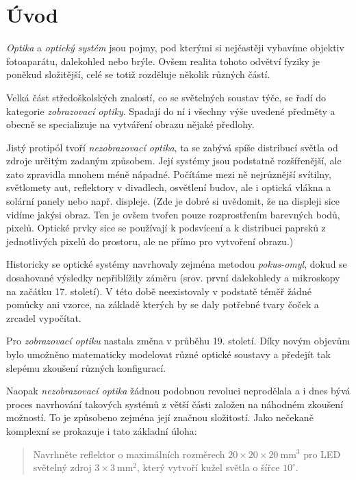 \chapter{Úvod}

\emph{Optika} a \emph{optický systém} jsou pojmy, pod kterými si nejčastěji vybavíme objektiv fotoaparátu, dalekohled nebo brýle. Ovšem realita tohoto odvětví fyziky je poněkud složitější, celé se totiž rozděluje několik různých částí.

Velká část středoškolských znalostí, co se světelných soustav týče, se řadí do kategorie \emph{zobrazovací optiky}. Spadají do ní i všechny výše uvedené předměty a obecně se specializuje na vytváření obrazu nějaké předlohy.

Jistý protipól tvoří \emph{nezobrazovací optika}, ta se zabývá spíše distribucí světla od zdroje určitým zadaným způsobem. Její systémy jsou podstatně rozšířenější, ale zato zpravidla mnohem méně nápadné. Počítáme mezi ně nejrůznější svítilny, světlomety aut, reflektory v divadlech, osvětlení budov, ale i optická vlákna a solární panely nebo např. displeje. (Zde je dobré si uvědomit, že na displeji sice vidíme jakýsi obraz. Ten je ovšem tvořen pouze rozprostřením barevných bodů, pixelů. Optické prvky sice se používají k podsvícení a k distribuci paprsků z jednotlivých pixelů do prostoru, ale ne přímo pro vytvoření obrazu.)

Historicky se optické systémy navrhovaly zejména metodou \emph{pokus-omyl}, dokud se dosahované výsledky nepřiblížily záměru (srov. první dalekohledy a mikroskopy na začátku 17. století). V této době neexistovaly v podstatě téměř žádné pomůcky ani vzorce, na základě kterých by se daly potřebné tvary čoček a zrcadel vypočítat. 

Pro \emph{zobrazovací optiku} nastala změna v průběhu 19. století. Díky novým objevům bylo umožněno matematicky modelovat různé optické soustavy a předejít tak slepému zkoušení různých konfigurací. \parencite{hannavy2008encyclopedia,wimmer2017carl}

Naopak \emph{nezobrazovací optika} žádnou podobnou revoluci neprodělala a i dnes bývá proces navrhování takových systémů z větší části založen na náhodném zkoušení možností. To je způsobeno zejména její značnou složitostí. Jako nečekaně komplexní se prokazuje i tato základní úloha:

\begin{quote}
    Navrhněte reflektor o maximálních rozměrech $20\times20\times20\ \mathrm{mm^3}$ pro LED světelný zdroj $3\times3\ \mathrm{mm^2}$, který vytvoří kužel světla o šířce $10^{\circ}$.
\end{quote}

